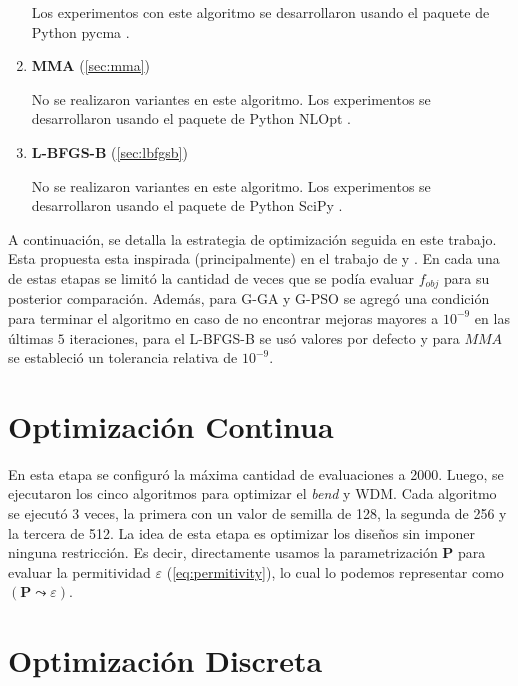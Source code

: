 \begin{enumerate}
  Los experimentos con este algoritmo se desarrollaron usando el paquete de Python pycma
  \citep{hansen2019pycma}.

  \item \textbf{MMA} (\autoref{sec:mma})

  No se realizaron variantes en este algoritmo.
  Los experimentos se desarrollaron usando el paquete de Python NLOpt \citep{nlopt}.

  \item \textbf{L-BFGS-B} (\autoref{sec:lbfgsb})

  No se realizaron variantes en este algoritmo.
  Los experimentos se desarrollaron usando el paquete de Python SciPy \citep{2020SciPy-NMeth}.

\end{enumerate}

A continuación, se detalla la estrategia de optimización seguida en este trabajo.
Esta propuesta esta inspirada (principalmente) en el trabajo de \cite{Su2020} y \cite{Christiansen2021}.
En cada una de estas etapas se limitó la cantidad de veces que se podía evaluar $f_{obj}$ para su
posterior comparación. Además, para G-GA y G-PSO se agregó una condición para terminar el algoritmo
en caso de no encontrar mejoras mayores a $10^{-9}$ en las últimas $5$ iteraciones, 
para el L-BFGS-B se usó valores por defecto y para $MMA$ se estableció un tolerancia relativa de $10^{-9}$.

\section{Optimización Continua}

En esta etapa se configuró la máxima cantidad de evaluaciones a 2000.
Luego, se ejecutaron los cinco algoritmos para optimizar el \emph{bend} y WDM.
Cada algoritmo se ejecutó 3 veces, la primera con un valor de semilla de 128, la segunda de 256 y
la tercera de 512.
La idea de esta etapa es optimizar los diseños sin imponer ninguna restricción.
Es decir, directamente usamos la parametrización $\boldsymbol{P}$ para evaluar la permitividad 
$\varepsilon$ (\autoref{eq:permitivity}),
lo cual lo podemos representar como $(\boldsymbol{P} \mathrel{\leadsto} \varepsilon)$.

\section{Optimización Discreta}

